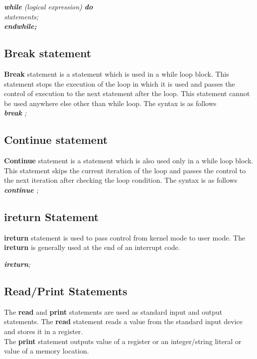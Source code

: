 \documentclass[11pt]{article}
\begin{document}
\textit{
\textbf{while} (logical expression) \textbf{do}  \\
 \indent \indent statements; \\
\indent \textbf{endwhile;}  \\
}


\subsection{Break statement}
\textbf{Break} statement is a statement which is used in a while loop block. This statement stops the execution of the loop in which it is used and passes the control of execution to the next statement after the loop. This statement cannot be used anywhere else other than while loop. The syntax is as follows\\

\textit{\textbf{break} ;}


\subsection{Continue statement}
\textbf{Continue} statement is a statement which is also used only in a while loop block. This statement skips the current iteration of the loop and passes the control to the next iteration after checking the loop condition. The syntax is as follows\\

\textit{\textbf{continue} ;}

\subsection{ireturn Statement}
\textbf{ireturn} statement is used to pass control from kernel mode to user mode. The \textbf{ireturn} is generally used at the end of an interrupt code.

\textit{\textbf{ireturn};}


\subsection{Read/Print Statements}

The \textbf{read} and \textbf{print} statements are used as standard input and output statements. The \textbf{read} statement reads a value from the standard input device and stores it in a register. \\
The \textbf{print} statement outputs value of a register or an integer/string literal or value of a memory location.
\end{document}
